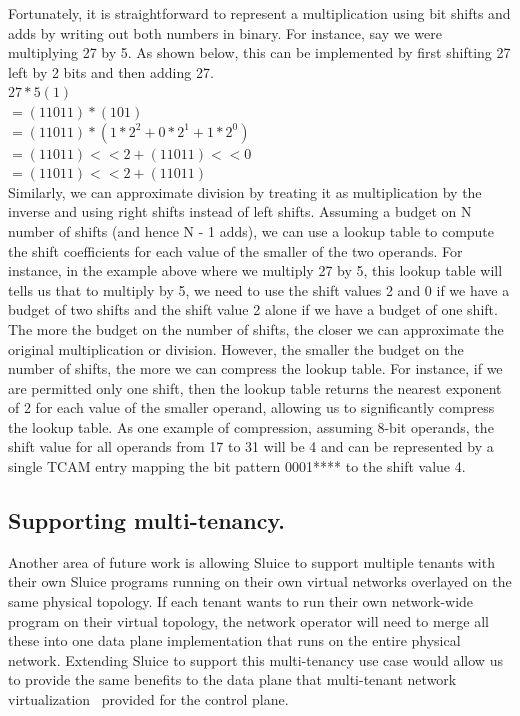 \documentclass[12pt, oneside]{article}
\begin{document}
Fortunately, it is straightforward to represent a multiplication using bit shifts and adds by writing out both numbers in binary. For instance, say we were multiplying 27 by 5. As shown below, this can be implemented by first shifting 27 left by 2 bits and then adding 27.\\
$27 * 5 (1)$\\
$= (11011) * (101)$\\
$= (11011) * (1 * 2^2 + 0 * 2^1 + 1 * 2^0)$\\
$= (11011) << 2 + (11011) << 0$\\
$= (11011) << 2 + (11011)$\\
Similarly, we can approximate division by treating it as multiplication by the inverse and using right shifts instead of left shifts. Assuming a budget on N number of shifts (and hence N - 1 adds), we can use a lookup table to compute the shift coefficients for each value of the smaller of the two operands. For instance, in the example above where we multiply 27 by 5, this lookup table will tells us that to multiply by 5, we need to use the shift values 2 and 0 if we have a budget of two shifts and the shift value 2 alone if we have a budget of one shift.
The more the budget on the number of shifts, the closer we can approximate the original multiplication or division. However, the smaller the budget on the number of shifts, the more we can compress the lookup table. For instance, if we are permitted only one shift, then the lookup table returns the nearest exponent of 2 for each value of the smaller operand, allowing us to significantly compress the lookup table. As one example of compression, assuming 8-bit operands, the shift value for all operands from 17 to 31 will be 4 and can be represented by a single TCAM entry mapping the bit pattern 0001**** to the shift value 4.

\subsection{Supporting multi-tenancy.} Another area of future work is allowing
Sluice to support multiple tenants with their own Sluice
programs running on their own virtual networks overlayed on the same physical
topology. If each tenant wants to run their own network-wide program on their
virtual topology, the network operator will need to merge all these into one
data plane implementation that runs on the entire physical network. Extending
Sluice to support this multi-tenancy use case would allow us to provide the
same benefits to the data plane that multi-tenant network
virtualization~\cite{multitenant} provided for the control plane.
\end{document}
